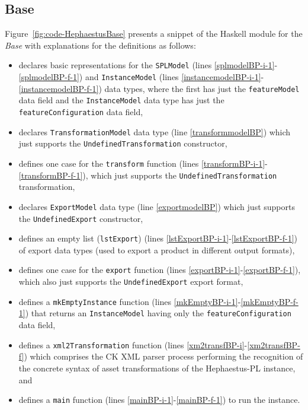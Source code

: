 
\subsection{\hp{} Base}

Figure~\ref{fig:code-HephaestusBase} presents a snippet of the Haskell module for the \hp{} \emph{Base} with explanations for the definitions as follows:

\begin{itemize}

\item declares basic representations for the \texttt{SPLModel} (lines \ref{splmodelBP-i-1}-\ref{splmodelBP-f-1}) and \texttt{InstanceModel} (lines \ref{instancemodelBP-i-1}-\ref{instancemodelBP-f-1}) data types, where the first has just the \texttt{featureModel} data field and the \texttt{InstanceModel} data type has just the \texttt{featureConfiguration} data field,

\item declares \texttt{TransformationModel} data type (line \ref{transformmodelBP}) which just supports the \texttt{UndefinedTransformation} constructor,

\item defines one case for the \texttt{transform} function (lines \ref{transformBP-i-1}-\ref{transformBP-f-1}), which just supports the \texttt{UndefinedTransformation} transformation,

\item declares \texttt{ExportModel} data type (line \ref{exportmodelBP}) which just supports the \texttt{UndefinedExport} constructor,

\item defines an empty list (\texttt{lstExport}) (lines \ref{lstExportBP-i-1}-\ref{lstExportBP-f-1}) of export data types (used to export a product in different output formats),

\item defines one case for the \texttt{export} function (lines \ref{exportBP-i-1}-\ref{exportBP-f-1}), which also just supports the \texttt{UndefinedExport} export format,

\item defines a \texttt{mkEmptyInstance} function (lines \ref{mkEmptyBP-i-1}-\ref{mkEmptyBP-f-1}) that returns an \texttt{InstanceModel} having only the \texttt{featureConfiguration} data field,

\item defines a \texttt{xml2Transformation} function (lines \ref{xm2transfBP-i}-\ref{xm2transfBP-f}) which comprises the CK XML parser process performing the recognition of the concrete syntax of asset transformations of the Hephaestus-PL instance, and

\item defines a \texttt{main} function (lines \ref{mainBP-i-1}-\ref{mainBP-f-1}) to run the \hp{} instance.

\end{itemize}

